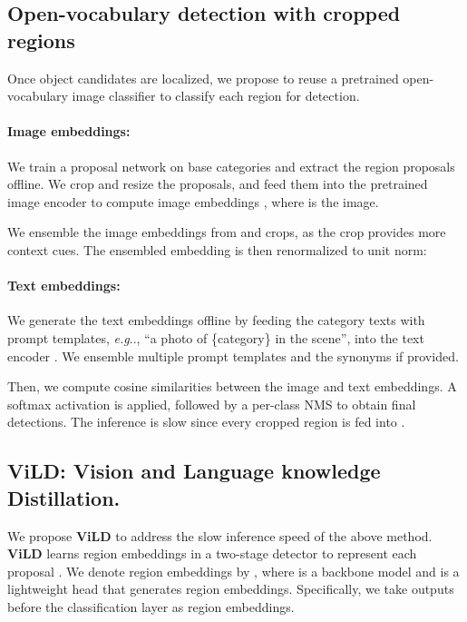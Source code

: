\documentclass{article} \usepackage{iclr2022_conference,times}
\makeatletter
\DeclareRobustCommand\onedot{\futurelet\@let@token\@onedot}
\def\@onedot{\ifx\@let@token.\else.\null\fi\xspace}
\def\eg{\emph{e.g}\onedot} \def\Eg{\emph{E.g}\onedot}
\makeatother
\begin{document}
\subsection{Open-vocabulary detection with cropped regions}
\label{subsec:detection_with_cropped_regions}
Once object candidates are localized, we propose to reuse a pretrained open-vocabulary image classifier to classify each region for detection. 

\paragraph{Image embeddings:} We train a proposal network on base categories  and extract the region proposals  offline.
We crop and resize the proposals, and feed them into the pretrained image encoder  to compute image embeddings , where  is the image.


We ensemble the image embeddings from  and  crops, as the  crop provides more context cues. The ensembled embedding is then renormalized to unit norm: 


\paragraph{Text embeddings:} We generate the text embeddings offline by feeding the category texts with prompt templates, \eg, ``a photo of \{category\} in the scene'', into the text encoder .
We ensemble multiple prompt templates and the synonyms if provided.

Then, we compute cosine similarities between the image and text embeddings. 
A softmax activation is applied, followed by a per-class NMS to obtain final detections.
The inference is slow since every cropped region is fed into .

\subsection{ViLD: Vision and Language knowledge Distillation.}\label{subsec:vild}
We propose \textbf{ViLD} to address the slow inference speed of the above method.
\textbf{ViLD} learns region embeddings in a two-stage detector to represent each proposal .
We denote region embeddings by , where  is a backbone model and  is a lightweight head that generates region embeddings.
Specifically, we take outputs before the classification layer as region embeddings.
\end{document}
